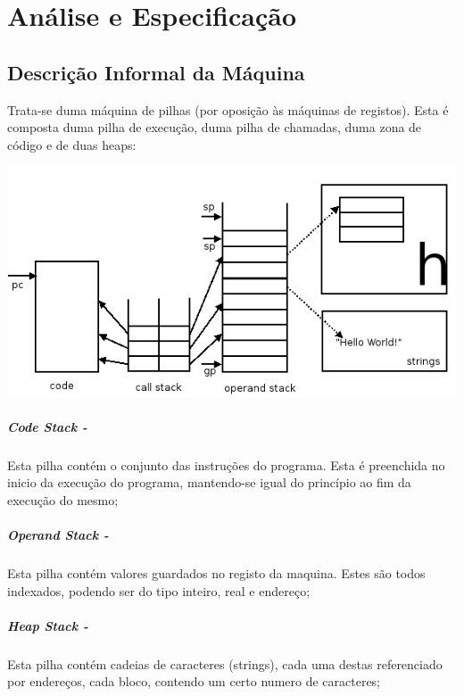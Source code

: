 \documentclass{report}
\begin{document}
\chapter{Análise e Especificação} \label{ae}
\section{Descrição Informal da Máquina}

\quad Trata-se duma máquina de pilhas (por oposição às máquinas de registos). Esta é composta duma pilha de execução, duma pilha de chamadas,
duma zona de código e de duas heaps:

\begin{center}
\includegraphics{stacks.png}
\end{center}

\paragraph{\quad Code Stack -}
Esta pilha contém o conjunto das instruções do programa. Esta é preenchida no inicio da execução do programa, mantendo-se igual
do princípio ao fim da execução do mesmo;
\paragraph{\quad Operand Stack -}
Esta pilha contém valores guardados no registo da maquina. Estes são todos indexados, podendo ser do tipo inteiro, real e endereço;
\paragraph{\quad Heap Stack -}
Esta pilha contém cadeias de caracteres (strings), cada uma destas referenciado por endereços, cada bloco,
contendo um certo numero de caracteres;
\end{document}
